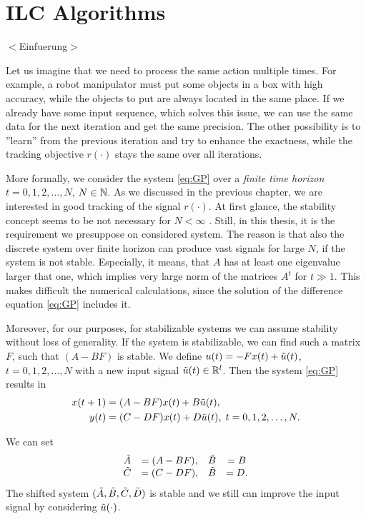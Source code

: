 \chapter{ILC Algorithms}
\label{ch:ILCAlg}
{\color{red} $<$Einfuerung$>$}


Let us imagine that we need to process the same action multiple times. 
For example, a robot manipulator must put some objects in a box with high accuracy, while the objects to put are always located in the same place. If we already have some input sequence, which solves this issue, we can use the same data for the next iteration and get the same precision. The other possibility is to ''learn'' from the previous iteration and try to enhance the exactness, while the tracking objective $r(\cdot)$ stays the same over all iterations.

More formally, we consider the system \eqref{eq:GP} over a \textit{finite time horizon} $t = 0, 1, 2, \dots, N$, $N \in {\mathbb{N}}$. As we discussed in the previous chapter, we are interested in good tracking of the signal $r(\cdot)$. At first glance, the stability concept seems to be not necessary for $N < \infty$ . Still, in this thesis, it is the requirement we presuppose on considered system. The reason is that also the discrete system over finite horizon can produce vast signals for large $N$, if the system is not stable. Especially, it means, that $A$ has at least one eigenvalue larger that one, which implies very large norm of the matrices $A^t$ for $t \gg 1$. This makes difficult the numerical calculations, since the solution of the difference equation \eqref{eq:GP} includes it. 

Moreover, for our purposes, for stabilizable systems we can assume stability without loss of generality. 
If the system is stabilizable, we can find such a matrix $F$, such that $(A - B F )$ is stable. 
We define $u(t) = - Fx(t) + \tilde{u}(t)$, $t = 0,1,2, \dots, N$ with a new input signal $\tilde{u} (t) \in {\mathbb{R}}^l$. Then the system \eqref{eq:GP} results in
\begin{align}
\begin{split}
x(t+1) &= (A - B F)x(t) + B \tilde{u} (t), \\
y(t)   &= (C - D F) x(t) + D\tilde{u}(t), \; t = 0, 1 ,2, \dots, N. 
\end{split}
\end{align}

We can set 
\begin{align}
\begin{array}{c c c c}
\tilde{A} &= (A - B F), &\tilde{B} &= B\\
\tilde{C}  & = (C - D F),&\tilde{B} & = D.
\end{array}
\end{align}
The shifted system $(\tilde{A}, \tilde{B} , \tilde{C}, \tilde{D})$ is stable and we still can improve the input signal by considering $\tilde{u}(\cdot)$.

